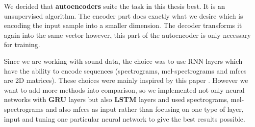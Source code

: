 We decided that \textbf{autoencoders} suite the task in this thesis best. It is an unsupervised algorithm. The encoder part does exactly what we desire which is encoding the input sample into a smaller dimension. The decoder transforms it again into the same vector however, this part of the autoencoder is only necessary for training.

Since we are working with sound data, the choice was to use RNN layers which have the ability to encode sequences (spectrograms, mel-spectrograms and mfccs are 2D matrices). These choices were mainly inspired by this paper \cite{inproceedings_RNNs}. However we want to add more methods into comparison, so we implemented not only neural networks with \textbf{GRU} layers but also \textbf{LSTM} layers and used spectrograms, mel-spectrograms and also mfccs as input rather than focusing on one type of layer, input and tuning one particular neural network to give the best results possible. 